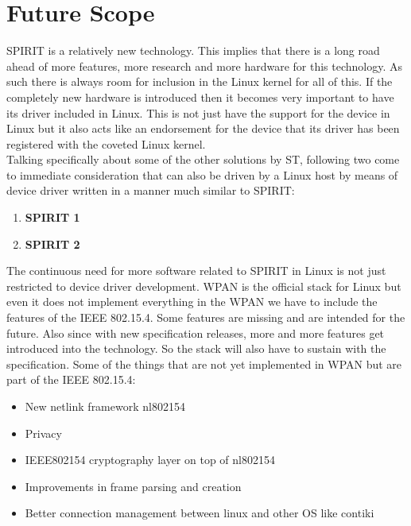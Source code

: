 \section{Future Scope}
SPIRIT is a relatively new technology. This implies that there is a long road ahead of more features, more research and more hardware for this technology. As such there is always room for inclusion in the Linux kernel for all of this. If the completely new hardware is introduced then it becomes very important to have its driver included in Linux. This is not just have the support for the device in Linux but it also acts like an endorsement for the device that its driver has been registered with the coveted Linux kernel.\\
Talking specifically about some of the other solutions by ST, following two come to immediate consideration that can also be driven by a Linux host by means of device driver written in a manner much similar to SPIRIT:
\begin{enumerate}
	\item \textbf{SPIRIT 1}
	\item \textbf{SPIRIT 2}
\end{enumerate}
The continuous need for more software related to SPIRIT in Linux is not just restricted to device driver development. WPAN is the official stack for Linux but even it does not implement everything in the WPAN we have to include the features of the IEEE 802.15.4. Some features are missing and are intended for the future. Also since with new specification releases, more and more features get introduced into the technology. So the stack will also have to sustain with the specification. Some of the things that are not yet implemented in WPAN but are part of the IEEE 802.15.4:
\begin{itemize}
	\item New netlink framework nl802154 
	\item Privacy
	\item IEEE802154 cryptography layer on top of nl802154
	\item Improvements in frame parsing and creation
	\item Better connection management between linux and other OS like contiki
\end{itemize}
